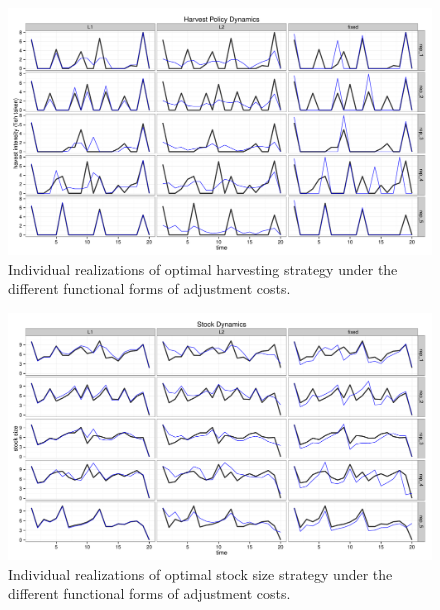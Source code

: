 \documentclass{article}\usepackage[]{graphicx}\usepackage[]{color}
\makeatletter
\def\maxwidth{ %
  \ifdim\Gin@nat@width>\linewidth
    \linewidth
  \else
    \Gin@nat@width
  \fi
}
\newenvironment{knitrout}{}{} %
\makeatother
\begin{document}
\begin{figure}
\begin{knitrout}
\color{fgcolor}
\includegraphics[width=\maxwidth]{figure/Figure_2} 

\end{knitrout}

  \caption{Individual realizations of optimal harvesting strategy under the different functional forms of adjustment costs.}
\end{figure}


\begin{figure}
\begin{knitrout}
\color{fgcolor}
\includegraphics[width=\maxwidth]{figure/Figure_3} 

\end{knitrout}

  \caption{Individual realizations of optimal stock size strategy under the different functional forms of adjustment costs.}
\end{figure}
\end{document}
